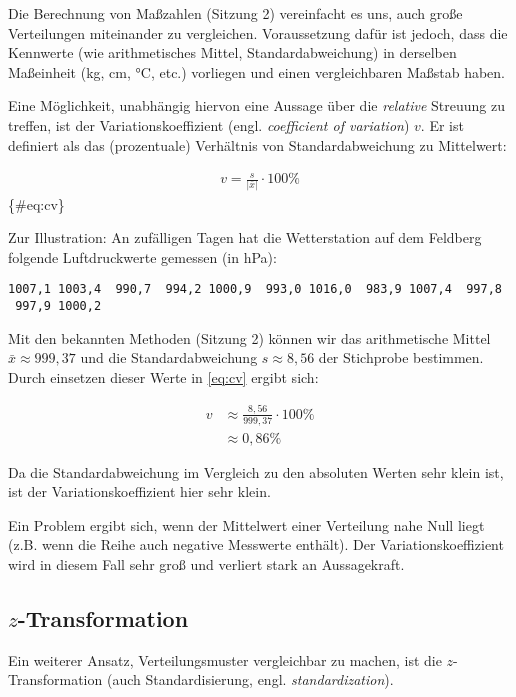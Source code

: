 \documentclass[
  ngerman,
]{article}
\begin{document}
Die Berechnung von Maßzahlen (Sitzung 2) vereinfacht es uns, auch große Verteilungen miteinander zu vergleichen. Voraussetzung dafür ist jedoch, dass die Kennwerte (wie arithmetisches Mittel, Standardabweichung) in derselben Maßeinheit (kg, cm, °C, etc.) vorliegen und einen vergleichbaren Maßstab haben.

Eine Möglichkeit, unabhängig hiervon eine Aussage über die \emph{relative} Streuung zu treffen, ist der Variationskoeffizient (engl. \emph{coefficient of variation}) \(v\). Er ist definiert als das (prozentuale) Verhältnis von Standardabweichung zu Mittelwert:

\[\begin{aligned}
v=\frac{s}{|\bar{x}|}\cdot 100\%
\end{aligned}
\]\{\#eq:cv\}

Zur Illustration: An zufälligen Tagen hat die Wetterstation auf dem Feldberg folgende Luftdruckwerte gemessen (in hPa):

\texttt{1007,1\ 1003,4\ \ 990,7\ \ 994,2\ 1000,9\ \ 993,0\ 1016,0\ \ 983,9\ 1007,4\ \ 997,8\ \ 997,9\ 1000,2}

Mit den bekannten Methoden (Sitzung 2) können wir das arithmetische Mittel \(\bar{x}\approx 999,37\) und die Standardabweichung \(s\approx8,56\) der Stichprobe bestimmen. Durch einsetzen dieser Werte in \autoref{eq:cv} ergibt sich:

\[\begin{aligned}
v&\approx\frac{8,56}{999,37}\cdot 100\%\\[4pt]
 &\approx0,86\%
\end{aligned}
\]

Da die Standardabweichung im Vergleich zu den absoluten Werten sehr klein ist, ist der Variationskoeffizient hier sehr klein.

Ein Problem ergibt sich, wenn der Mittelwert einer Verteilung nahe Null liegt (z.B. wenn die Reihe auch negative Messwerte enthält). Der Variationskoeffizient wird in diesem Fall sehr groß und verliert stark an Aussagekraft.

\hypertarget{z-transformation}{%
\subsection{\texorpdfstring{\(z\)-Transformation}{z-Transformation}}\label{z-transformation}}

Ein weiterer Ansatz, Verteilungsmuster vergleichbar zu machen, ist die \(z\)-Transformation (auch Standardisierung, engl. \emph{standardization}).
\end{document}
